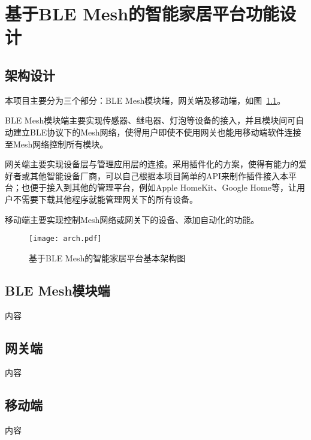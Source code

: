 \chapter{基于BLE Mesh的智能家居平台功能设计}

\section{架构设计}
本项目主要分为三个部分：BLE Mesh模块端，网关端及移动端，如图~\ref{fig:arch}。

BLE Mesh模块端主要实现传感器、继电器、灯泡等设备的接入，并且模块间可自动建立BLE协议下的Mesh网络，使得用户即使不使用网关也能用移动端软件连接至Mesh网络控制所有模块。

网关端主要实现设备层与管理应用层的连接。采用插件化的方案，使得有能力的爱好者或其他智能设备厂商，可以自己根据本项目简单的API来制作插件接入本平台；也便于接入到其他的管理平台，例如Apple HomeKit、Google Home等，让用户不需要下载其他程序就能管理网关下的所有设备。

移动端主要实现控制Mesh网络或网关下的设备、添加自动化的功能。
\begin{figure}[H]
    \centering
    \texttt{[image: arch.pdf]}
    \caption{基于BLE Mesh的智能家居平台基本架构图}
    \label{fig:arch}
\end{figure}

\section{BLE Mesh模块端}
内容

\section{网关端}
内容

\section{移动端}
内容
